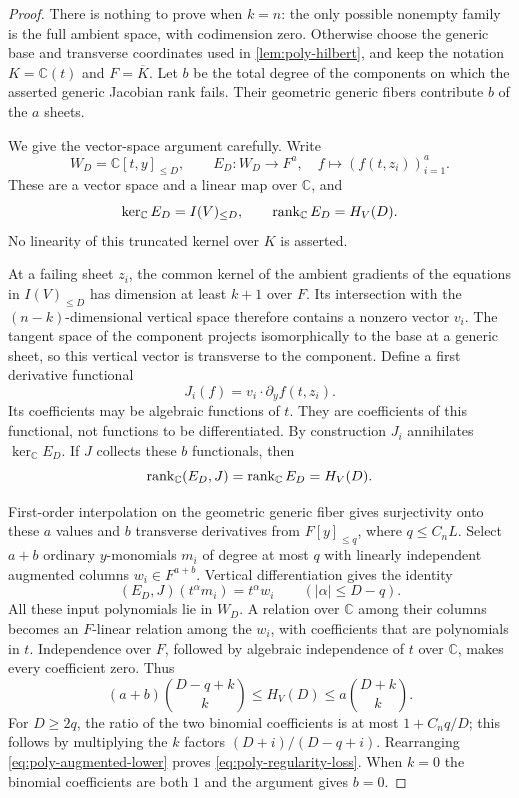 \begin{proof}
There is nothing to prove when $k=n$: the only possible nonempty family is the full ambient space, with codimension zero.  Otherwise choose the generic base and transverse coordinates used in \cref{lem:poly-hilbert}, and keep the notation $K=\mathbb{C}(t)$ and $F=\overline K$.  Let $b$ be the total degree of the components on which the asserted generic Jacobian rank fails.  Their geometric generic fibers contribute $b$ of the $a$ sheets.

We give the vector-space argument carefully.  Write
\[
 W_D=\mathbb{C}[t,y]_{\le D},\qquad
 E_D:W_D\longrightarrow F^a,
       \quad f\longmapsto (f(t,z_i))_{i=1}^a.
\]
These are a vector space and a linear map over $\mathbb{C}$, and
\[
 \ker_{\mathbb{C}}E_D=I(V)_{\le D},\qquad
 \rank_{\mathbb{C}}E_D=H_V(D).
\]
No linearity of this truncated kernel over $K$ is asserted.

At a failing sheet $z_i$, the common kernel of the ambient gradients of the equations in $I(V)_{\le D}$ has dimension at least $k+1$ over $F$.  Its intersection with the $(n-k)$-dimensional vertical space therefore contains a nonzero vector $v_i$.  The tangent space of the component projects isomorphically to the base at a generic sheet, so this vertical vector is transverse to the component. Define a first derivative functional
\[
 J_i(f)=v_i\mathbin{\cdot}\partial_yf(t,z_i).
\]
Its coefficients may be algebraic functions of $t$.  They are coefficients of this functional, not functions to be differentiated. By construction $J_i$ annihilates $\ker_{\mathbb{C}}E_D$.  If $J$ collects these $b$ functionals, then
\begin{equation}\label{eq:poly-jet-factorization}
 \rank_{\mathbb{C}}(E_D,J)=\rank_{\mathbb{C}}E_D=H_V(D).
\end{equation}

First-order interpolation on the geometric generic fiber gives surjectivity onto these $a$ values and $b$ transverse derivatives from $F[y]_{\le q}$, where $q\le C_nL$.  Select $a+b$ ordinary $y$-monomials $m_i$ of degree at most $q$ with linearly independent augmented columns $w_i\in F^{a+b}$.  Vertical differentiation gives the identity
\[
 (E_D,J)(t^\alpha m_i)=t^\alpha w_i
       \qquad(|\alpha|\le D-q).
\]
All these input polynomials lie in $W_D$.  A relation over $\mathbb{C}$ among their columns becomes an $F$-linear relation among the $w_i$, with coefficients that are polynomials in $t$.  Independence over $F$, followed by algebraic independence of $t$ over $\mathbb{C}$, makes every coefficient zero.  Thus
\begin{equation}\label{eq:poly-augmented-lower}
 (a+b)\binom{D-q+k}{k}\le H_V(D)
                  \le a\binom{D+k}{k}.
\end{equation}
For $D\ge2q$, the ratio of the two binomial coefficients is at most $1+C_nq/D$; this follows by multiplying the $k$ factors $(D+i)/(D-q+i)$.  Rearranging \eqref{eq:poly-augmented-lower} proves \eqref{eq:poly-regularity-loss}.  When $k=0$ the binomial coefficients are both $1$ and the argument gives $b=0$.


\end{proof}
